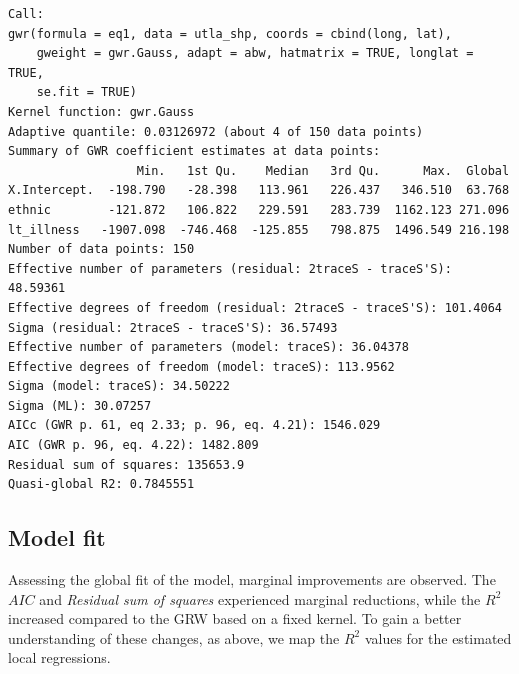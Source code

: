 \documentclass[
  letterpaper,
  DIV=11,
  numbers=noendperiod,
  oneside]{scrreprt}
\begin{document}
\begin{verbatim}
Call:
gwr(formula = eq1, data = utla_shp, coords = cbind(long, lat), 
    gweight = gwr.Gauss, adapt = abw, hatmatrix = TRUE, longlat = TRUE, 
    se.fit = TRUE)
Kernel function: gwr.Gauss 
Adaptive quantile: 0.03126972 (about 4 of 150 data points)
Summary of GWR coefficient estimates at data points:
                  Min.   1st Qu.    Median   3rd Qu.      Max.  Global
X.Intercept.  -198.790   -28.398   113.961   226.437   346.510  63.768
ethnic        -121.872   106.822   229.591   283.739  1162.123 271.096
lt_illness   -1907.098  -746.468  -125.855   798.875  1496.549 216.198
Number of data points: 150 
Effective number of parameters (residual: 2traceS - traceS'S): 48.59361 
Effective degrees of freedom (residual: 2traceS - traceS'S): 101.4064 
Sigma (residual: 2traceS - traceS'S): 36.57493 
Effective number of parameters (model: traceS): 36.04378 
Effective degrees of freedom (model: traceS): 113.9562 
Sigma (model: traceS): 34.50222 
Sigma (ML): 30.07257 
AICc (GWR p. 61, eq 2.33; p. 96, eq. 4.21): 1546.029 
AIC (GWR p. 96, eq. 4.22): 1482.809 
Residual sum of squares: 135653.9 
Quasi-global R2: 0.7845551 
\end{verbatim}

\subsection{Model fit}\label{model-fit}

Assessing the global fit of the model, marginal improvements are
observed. The \(AIC\) and \emph{Residual sum of squares} experienced
marginal reductions, while the \(R^{2}\) increased compared to the GRW
based on a fixed kernel. To gain a better understanding of these
changes, as above, we map the \(R^{2}\) values for the estimated local
regressions.
\end{document}
